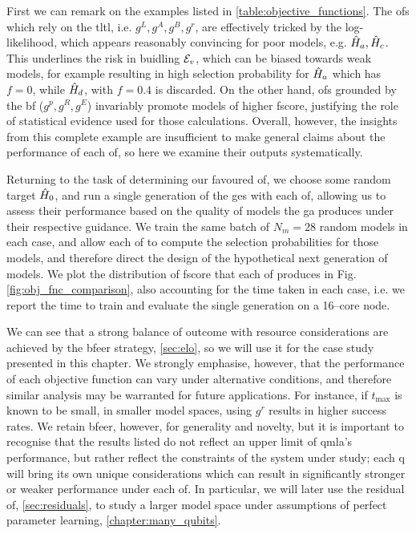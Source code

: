 {\par 

First we can remark on the examples listed in \cref{table:objective_functions}. 
The \glspl{of} which rely on the \gls{tltl}, i.e. $g^L, g^A, g^B, g^r$, 
    are effectively tricked by the log-likelihood, which appears reasonably convincing for 
    poor models, e.g. $\hat{H}_a, \hat{H}_c$. 
This underlines the risk in buidling ${ \mathcal{E} }_v$, which can be biased towards weak models, 
    for example resulting in high selection probability for $\hat{H}_a$ which has $f=0$, 
    while $\hat{H}_d$, with $f=0.4$ is discarded. 
On the other hand, \glspl{of} grounded by the \gls{bf} ($g^p, g^R, g^E$) invariably 
    promote models of higher \gls{fscore}, justifying the role of statistical evidence 
    used for those calculations. 
Overall, however, the insights from this complete example are insufficient to 
    make general claims about the performance of each \gls{of}, 
    so here we examine their outputs systematically. 
\par 

Returning to the task of determining our favoured \gls{of}, 
    we choose some random target $\hat{H}_0$, and run a single generation of the \gls{ges} with each \gls{of}, 
    allowing us to assess their performance based on the quality of models the \gls{ga} 
    produces under their respective guidance.
We train the same batch of $N_m=28$ random models in each case, and allow each \gls{of} 
    to compute the selection probabilities for those models, 
    and therefore direct the design of the hypothetical next generation of models. 
We plot the distribution of \gls{fscore} that each \gls{of} produces in Fig. \ref{fig:obj_fnc_comparison},
    also accounting for the time taken in each case, i.e. 
    we report the time to train and evaluate the single generation on a 16--core node.
\par

We can see that a strong balance of outcome with resource considerations 
    are achieved by the \gls{bfeer} strategy, \cref{sec:elo},
    so we will use it for the case study presented in this chapter. 
We strongly emphasise, however, that the performance of each objective function
    can vary under alternative conditions, and therefore similar analysis may 
    be warranted for future applications. 
For instance, if $t_{\textrm{max}}$ is known to be small, 
    in smaller model spaces, using $g^r$ results in higher success rates.
We retain \gls{bfeer}, however, for generality and novelty, 
    but it is important to recognise that the results listed do not reflect
    an upper limit of \gls{qmla}'s performance, 
    but rather reflect the constraints of the system under study; 
    each \gls{q} will bring its own unique considerations which can result in 
    significantly stronger or weaker performance under each \gls{of}. 
In particular, we will later use the residual \gls{of}, \cref{sec:residuals}, 
    to study a larger \gls{model space} under assumptions of perfect parameter learning, \cref{chapter:many_qubits}.



}
